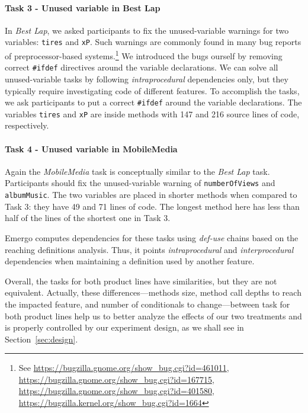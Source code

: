 \paragraph{Task 3 - Unused variable in Best Lap}

In \textit{Best Lap}, we asked participants to fix the unused-variable warnings for two variables: \texttt{tires} and \texttt{xP}. Such warnings are commonly found in many bug reports of preprocessor-based systems.\footnote{See \url{https://bugzilla.gnome.org/show_bug.cgi?id=461011}, \url{https://bugzilla.gnome.org/show_bug.cgi?id=167715}, \url{https://bugzilla.gnome.org/show_bug.cgi?id=401580}, \url{https://bugzilla.kernel.org/show_bug.cgi?id=1664}} We introduced the bugs ourself by removing correct \texttt{\#ifdef} directives around the variable declarations. We can solve all unused-variable tasks by following \textit{intraprocedural} dependencies only, but they typically require investigating code of different features. To accomplish the tasks, we ask participants to put a correct \texttt{\#ifdef} around the variable declarations. The variables \texttt{tires} and \texttt{xP} are inside methods with 147 and 216 source lines of code, respectively. 

\paragraph{Task 4 - Unused variable in MobileMedia}

Again the \textit{MobileMedia} task is conceptually similar to the \textit{Best Lap} task. Participants should fix the unused-variable warning of \texttt{numberOfViews} and \texttt{albumMusic}. The two variables are placed in shorter methods when compared to Task 3: they have 49 and 71 lines of code. The longest method here has less than half of the lines of the shortest one  in Task 3. 

Emergo computes dependencies for these tasks using \textit{def-use} chains based on the reaching definitions analysis. Thus, it points \textit{intraprocedural} and \textit{interprocedural} dependencies when maintaining a definition used by another feature.

Overall, the tasks for both product lines have similarities, but they are not equivalent. Actually, these differences---methods size, method call depths to reach the impacted feature, and number of conditionals to change---between task for both product lines help us to better analyze the effects of our two treatments and is properly controlled by our experiment design, as we shall see in Section~\ref{sec:design}.

